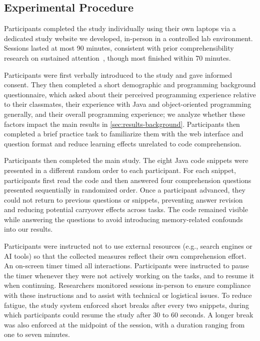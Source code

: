 \subsection{Experimental Procedure}

Participants completed the study individually using their own laptops via a dedicated study website we developed, in-person in a controlled lab environment. Sessions lasted at most 90 minutes, consistent with prior comprehensibility research on sustained attention~\cite{52,33-13,33-24},
though most finished within 70 minutes.

Participants were first verbally introduced to the study and gave informed consent.
They then completed a short demographic and programming background questionnaire, which asked about their perceived programming experience relative to their classmates,
their experience with Java and object-oriented programming generally, and their overall programming experience; we analyze whether these factors impact the main results
in \cref{sec:results-background}.
Participants then completed a brief practice task to familiarize them with the web interface and question format and reduce learning effects unrelated to code comprehension.

Participants then completed the main study. The eight Java code snippets were presented in a different random order to each participant.
For each snippet, participants first read the code and then answered four comprehension questions presented sequentially in randomized order.
Once a participant advanced, they could not return to previous questions or snippets, preventing answer revision and reducing potential carryover effects across tasks.
The code remained visible while answering the questions to avoid introducing memory-related confounds into our results.

Participants were instructed not to use external resources (e.g., search engines or AI tools) so that the collected measures reflect their own comprehension effort.
An on-screen timer timed all interactions. Participants were instructed to pause the timer whenever they were not actively working on the tasks, and to resume it when continuing.
Researchers monitored sessions in-person to ensure compliance with these instructions and to assist with technical or logistical issues. To reduce fatigue, the study system enforced short breaks after every two snippets, during which participants could resume the study after 30 to 60 seconds.
A longer break was also enforced at the midpoint of the session, with a duration ranging from one to seven minutes. 

